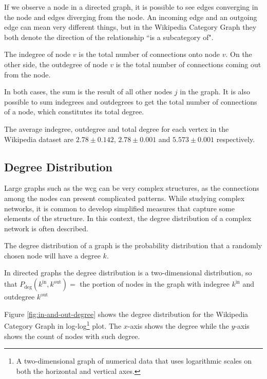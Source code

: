 If we observe a node in a directed graph, it is possible to see edges converging in the node and edges diverging from the node. An incoming edge and an outgoing edge can mean very different things, but in the Wikipedia Category Graph they both denote the direction of the relationship ``is a subcategory of". 

The indegree of node $v$ is the total number of connections onto node $v$.
On the other side, the outdegree of node $v$ is the total number of connections coming out from the node.

In both cases, the sum is the result of all other nodes $j$ in the graph. It is also possible to sum indegrees and outdegrees to get the total number of connections of a node, which constitutes its total degree.

The average indegree, outdegree and total degree for each vertex in the Wikipedia dataset are $2.78\pm0.142$, $2.78\pm0.001$ and $5.573\pm0.001$ respectively. 

\subsection{\hspace*{3pt}  Degree Distribution}

Large graphs such as the \gls{wcg} can be very complex structures, as the connections among the nodes can present complicated patterns. 
While studying complex networks, it is common to develop simplified measures that capture some elements of the structure. In this context, the degree distribution of a complex network is often described. 

The degree distribution of a graph is the probability distribution that a randomly chosen node will have a degree $k$. 

In directed graphs the degree distribution is a two-dimensional distribution, so that $P_{\text{deg}}(k^{\text{in}},k^{\text{out}} ) =$ the portion of nodes in the graph with indegree $k^{\text{in}}$ and outdegree $k^{\text{out}}$

Figure \ref{fig:in-and-out-degree} shows the degree distribution for the Wikipedia Category Graph in log-log\footnote{
A two-dimensional graph of numerical data that uses logarithmic scales on both the horizontal and vertical axes. 
} plot. The $x$-axis shows the degree while the $y$-axis shows the count of nodes with such degree. 


